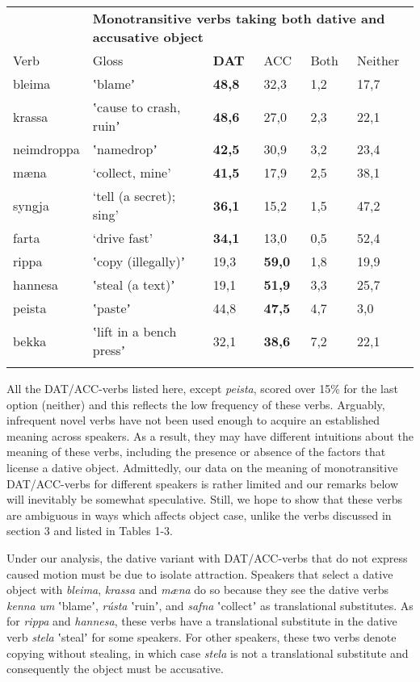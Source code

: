 \documentclass[output=paper,modfonts,nonflat]{langsci/langscibook}
\begin{document}
\tabletail{}
\tablelasttail{}
\begin{tabularx}{\textwidth}{XXXXXX}
\lsptoprule

\multicolumn{1}{X}{{\bfseries \tabref{tab:key:4}:}} & \multicolumn{5}{X}{{\bfseries Monotransitive verbs taking both dative and accusative object} }\\
Verb & Gloss & \textbf{DAT} & ACC & Both & Neither\\
bleima & ʽblameʼ & \textbf{48,8} & 32,3 & 1,2 & 17,7\\
krassa & ʽcause to crash, ruinʼ & \textbf{48,6} & 27,0 & 2,3 & 22,1\\
neimdroppa & ʽnamedropʼ & \textbf{42,5} & 30,9 & 3,2 & 23,4\\
mæna & ‘collect, mine’ & \textbf{41,5} & 17,9 & 2,5 & 38,1\\
syngja & ‘tell (a secret); sing’ & \textbf{36,1} & 15,2 & 1,5 & 47,2\\
farta & ‘drive fast’ & \textbf{34,1} & 13,0 & 0,5 & 52,4\\
rippa & ʽcopy (illegally)ʼ & 19,3 & \textbf{59,0} & 1,8 & 19,9\\
hannesa & ʽsteal (a text)ʼ & 19,1 & \textbf{51,9} & 3,3 & 25,7\\
peista & ʽpasteʼ & 44,8 & \textbf{47,5} & 4,7 & 3,0\\
bekka & ʽlift in a bench pressʼ & 32,1 & \textbf{38,6} & 7,2 & 22,1\\
\lspbottomrule
\end{tabularx}
All the DAT/ACC-verbs listed here, except \textit{peista}, scored over 15\% for the last option (neither) and this reflects the low frequency of these verbs. Arguably, infrequent novel verbs have not been used enough to acquire an established meaning across speakers. As a result, they may have different intuitions about the meaning of these verbs, including the presence or absence of the factors that license a dative object. Admittedly, our data on the meaning of monotransitive DAT/ACC-verbs for different speakers is rather limited and our remarks below will inevitably be somewhat speculative. Still, we hope to show that these verbs are ambiguous in ways which affects object case, unlike the verbs discussed in section 3 and listed in Tables 1-3. 

Under our analysis, the dative variant with DAT/ACC-verbs that do not express caused motion must be due to isolate attraction. Speakers that select a dative object with \textit{bleima}, \textit{krassa} and \textit{mæna} do so because they see the dative verbs \textit{kenna} \textit{um} ʽblameʼ, \textit{rústa} ʽruinʼ, and \textit{safna} ʽcollectʼ as translational substitutes. As for \textit{rippa} and \textit{hannesa}, these verbs have a translational substitute in the dative verb \textit{stela} ʽstealʼ for some speakers. For other speakers, these two verbs denote copying without stealing, in which case \textit{stela} is not a translational substitute and consequently the object must be accusative. 
\end{document}
